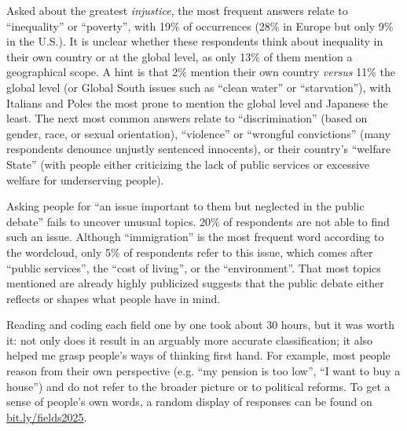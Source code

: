 \documentclass[12pt,english]{article}
\begin{document}
\begin{bibunit}
Asked about the greatest \textit{injustice}, the most frequent answers relate to ``inequality'' or ``poverty'', with 19\% of occurrences (28\% in Europe but only 9\% in the U.S.). It is unclear whether these respondents think about inequality in their own country or at the global level, as only 13\% of them mention a geographical scope. A hint is that 2\% mention their own country \textit{versus} 11\% the global level (or Global South issues such as ``clean water'' or ``starvation''), with Italians and Poles the most prone to mention the global level and Japanese the least. The next most common answers relate to ``discrimination'' (based on gender, race, or sexual orientation), ``violence'' or ``wrongful convictions'' (many respondents denounce unjustly sentenced innocents), or their country's ``welfare State'' (with people either criticizing the lack of public services or excessive welfare for underserving people). 

Asking people for ``an issue important to them but neglected in the public debate'' fails to uncover unusual topics. 20\% of respondents are not able to find such an issue. Although ``immigration'' is the most frequent word according to the wordcloud, only 5\% of respondents refer to this issue, which comes after ``public services'', the ``cost of living'', or the ``environment''. That most topics mentioned are already highly publicized suggests that the public debate either reflects or shapes what people have in mind. %

Reading and coding each field one by one took about 30 hours, but it was worth it: not only does it result in an arguably more accurate classification; it also helped me grasp people's ways of thinking first hand. For example, most people reason from their own perspective (e.g. ``my pension is too low'', ``I want to buy a house'') and do not refer to the broader picture or to political reforms. To get a sense of people's own words, a random display of responses can be found on \href{http://preferences-pol.fr/fields2025.html}{bit.ly/fields2025}.


\end{bibunit}
\end{document}
